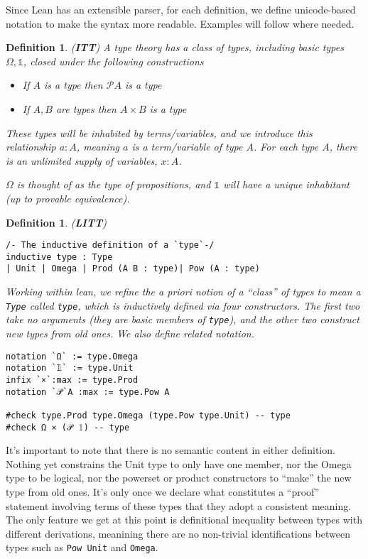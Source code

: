 \documentclass[12pt,leqno]{article}
\def\lc{\lstinline}
\theoremstyle{example}
\newtheorem{definition}[theorem]{Definition}
\numberwithin{equation}{section}
\begin{document}
Since Lean has an extensible parser, for each definition, we define unicode-based notation to make the syntax more readable. Examples will follow where needed.

\begin{definition}(\textbf{ITT})
  A type theory has a class of \emph{types}, including basic types $\Omega, \mathds{1}$, closed under the following constructions
  \begin{itemize}
    \item If $A$ is a type then $\mathscr{P}A$ is a type
    \item If $A,B$ are types then $A \times B$ is a type
  \end{itemize}

  These types will be inhabited by \emph{terms/variables}, and we introduce this relationship $a : A$, meaning $a$ is a term/variable of type $A$. For each type $A$, there is an unlimited supply of \emph{variables}, $x : A$.

  $\Omega$ is thought of as the type of propositions, and $\mathds{1}$ will have a unique inhabitant (up to provable equivalence).
\end{definition}

\begin{definition}(\textbf{LITT})
\begin{lstlisting}[frame=single]
/- The inductive definition of a `type`-/
inductive type : Type
| Unit | Omega | Prod (A B : type)| Pow (A : type)
\end{lstlisting}
Working within lean, we refine the a priori notion of a ``class'' of types to mean a \lc{Type} called \lc{type}, which is inductively defined via four constructors. The first two take no arguments (they are basic members of \lc{type}), and the other two construct new types from old ones. We also define related notation. 
\begin{lstlisting}
notation `Ω` := type.Omega
notation `𝟙` := type.Unit
infix `×`:max := type.Prod
notation `𝒫`A :max := type.Pow A

#check type.Prod type.Omega (type.Pow type.Unit) -- type
#check Ω × (𝒫 𝟙) -- type
\end{lstlisting}
\end{definition}

It's important to note that there is no semantic content in either definition. Nothing yet constrains the Unit type to only have one member, nor the Omega type to be logical, nor the powerset or product constructors to ``make'' the new type from old ones. It's only once we declare what constitutes a ``proof'' statement involving terms of these types that they adopt a consistent meaning. The only feature we get at this point is definitional inequality between types with different derivations, meanining there are no non-trivial identifications between types such as \lc{Pow Unit} and \lc{Omega}.
\end{document}
